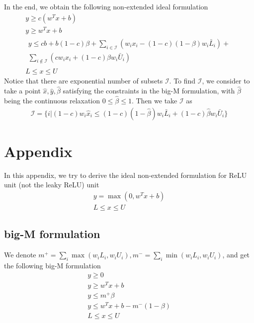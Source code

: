 \documentclass{article}
\begin{document}
In the end, we obtain the following non-extended ideal formulation
\begin{subequations}
\begin{align}
	y \ge c(w^Tx+b)\label{eq:leaky_relu_nonextended_ideal1}\\
	y \ge w^Tx+b\label{eq:leaky_relu_nonextended_ideal2}\\
	\begin{split}
		y \le cb + b(1-c)\beta + \sum_{i\in\mathcal{I}}\left(w_ix_i -(1-c)(1-\beta)w_i\bar{L}_i\right) +\\ \sum_{i\notin\mathcal{I}}\left(cw_ix_i + (1-c)\beta w_i\bar{U}_i\right)\label{eq:leaky_relu_nonextended_ideal3}
	\end{split}\\
	L\le x \le U\label{eq:leaky_relu_nonextended_ideal4}
\end{align}
\end{subequations}
Notice that there are exponential number of subsets $\mathcal{I}$. To find $\mathcal{I}$, we consider to take a point $\hat{x}, \hat{y}, \hat{\beta}$ satisfying the constraints in the big-M formulation, with $\hat{\beta}$ being the continuous relaxation $0 \le \hat{\beta} \le 1$. Then we take $\mathcal{I}$ as
\begin{align}
	\mathcal{I} = \{i|(1-c)w_i\hat{x}_i \le (1-c)(1-\hat{\beta})w_i\bar{L}_i + (1-c)\hat{\beta}w_i\bar{U}_i\}
\end{align}



\section{Appendix}
In this appendix, we try to derive the ideal non-extended formulation for ReLU unit (not the leaky ReLU) unit 
\begin{subequations}
\begin{align}
	y = \max(0, w^Tx + b)\\
	L \le x \le U
\end{align}
\end{subequations}
\subsection{big-M formulation}
We denote $m^+ = \sum_i \max(w_iL_i, w_iU_i), m^- = \sum_i \min(w_iL_i, w_iU_i)$, and get the following big-M formulation
\begin{subequations}
\begin{align}
	y \ge 0\\
	y \ge w^Tx + b\\
	y \le m^+\beta\\
	y \le w^Tx+b - m^-(1-\beta)\\
	L \le x \le U
\end{align}
\end{subequations}
\end{document}
